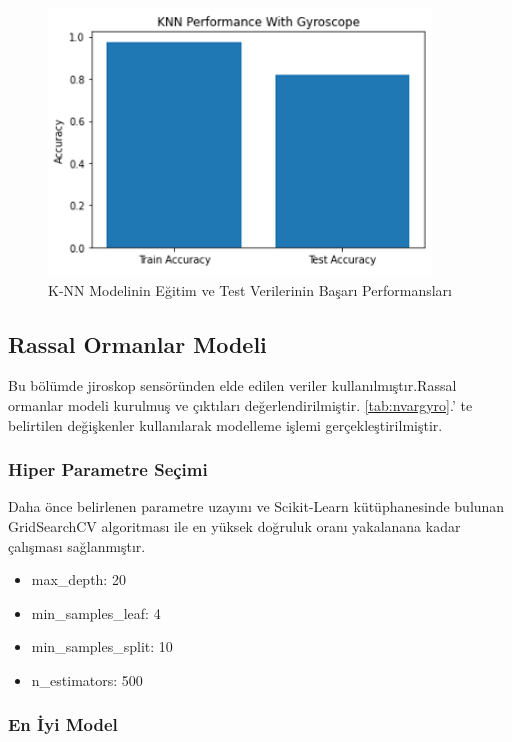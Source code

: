 \documentclass[12pt,twoside]{deuthesis}
\providecommand{\tightlist}{%
  \setlength{\itemsep}{0pt}\setlength{\parskip}{0pt}}
\begin{document}
\begin{figure}

{\centering \includegraphics[width=0.6\linewidth,height=0.25\textheight]{figure/knn_testtrainaccuracy} 

}

\caption{K-NN Modelinin Eğitim ve Test Verilerinin Başarı Performansları}\label{fig:knntesttrain}
\end{figure}
\hypertarget{rassal-ormanlar-modeli}{%
\subsection{Rassal Ormanlar Modeli}\label{rassal-ormanlar-modeli}}

Bu bölümde jiroskop sensöründen elde edilen veriler kullanılmıştır.Rassal ormanlar modeli kurulmuş ve çıktıları değerlendirilmiştir.
\ref{tab:nvargyro}.' te belirtilen değişkenler kullanılarak modelleme işlemi gerçekleştirilmiştir.

\hypertarget{hiper-parametre-seuxe7imi-1}{%
\subsubsection{Hiper Parametre Seçimi}\label{hiper-parametre-seuxe7imi-1}}

Daha önce belirlenen parametre uzayını ve Scikit-Learn kütüphanesinde bulunan GridSearchCV algoritması ile en yüksek doğruluk oranı yakalanana kadar çalışması sağlanmıştır.
\begin{itemize}
\tightlist
\item
  max\_depth: 20
\item
  min\_samples\_leaf: 4
\item
  min\_samples\_split: 10
\item
  n\_estimators: 500
\end{itemize}
\hypertarget{en-iyi-model-1}{%
\subsubsection{En İyi Model}\label{en-iyi-model-1}}
\end{document}
